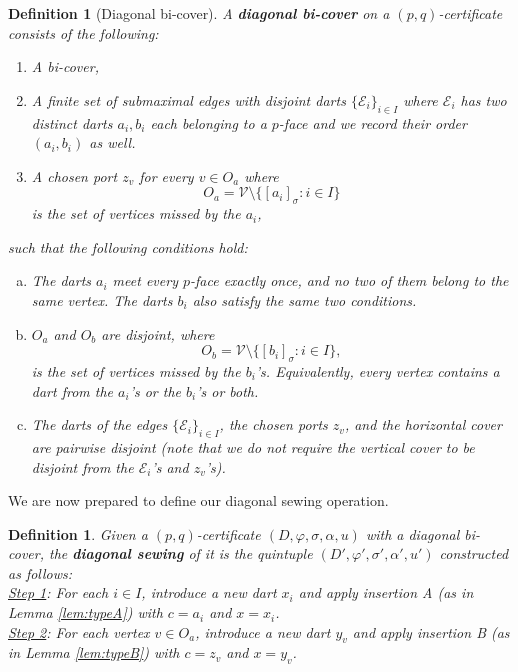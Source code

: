 \documentclass[11pt]{article}
\newtheorem{definition}[theorem]{Definition}
\theoremstyle{remark}
\newcommand{\orb}[1]{[#1]_{\sigma}}
\newcommand{\cE}{\mathcal E}
\begin{document}
\begin{definition}[Diagonal bi-cover]\label{def:Dframe}
A {\bf diagonal bi-cover}
on a $(p,q)$-certificate consists of the following:
\begin{enumerate}
    \item A bi-cover,
    \item A finite set of submaximal edges with disjoint darts $\{\cE_i\}_{i\in I}$ where $\cE_i$ has two distinct darts $a_i,b_i$ each belonging to a $p$-face and we record their order $(a_i,b_i)$ as well. 
\item A chosen port $z_v$ for every $v\in O_a$ where
\[
 O_a=\mathcal V \setminus \{\orb{a_i}:i\in I\}
\]
is the set of vertices missed by the $a_i$, 
\end{enumerate} 
such that the following conditions hold: %

\begin{enumerate}[(a)]
\item The darts $a_i$  meet every $p$-face exactly once, 
and no two of them belong to the same vertex.  The darts
$b_i$ also satisfy the same two conditions.

\item $O_a$ and $O_b$ are disjoint, where 
\[
        O_b=\mathcal V \setminus \{\orb{b_i}:i\in I\},
\]
is the set of vertices missed by the $b_i$'s. 
Equivalently, every vertex contains a dart from the $a_i$'s or the $b_i$'s or both. 

\item The darts of the edges $\{\cE_i\}_{i\in I}$, the chosen ports $z_v$, and the
horizontal cover are pairwise disjoint (note that we do not require the vertical cover to be disjoint from the $\cE_i$'s and $z_v$'s).
\end{enumerate}
\end{definition}

We are now prepared to define our diagonal sewing operation. 

\begin{definition}\label{def:DSewing} Given a $(p,q)$-certificate $(D,\varphi,\sigma,\alpha,u)$ with a
diagonal bi-cover, the {\bf diagonal sewing} of it is the quintuple $(D',\varphi', \sigma',\alpha', u')$ constructed as follows: \\

\noindent \underline{Step 1}: For each $i\in I$, introduce a new dart $x_i$ and apply insertion A (as in Lemma \ref{lem:typeA}) with $c=a_i$ and $x=x_i$. \\

\noindent \underline{Step 2}: For each vertex $v\in O_a$, introduce a new dart $y_v$ and apply insertion B (as in Lemma \ref{lem:typeB})
with $c=z_v$ and $x=y_v$. 
\end{definition}
\end{document}
